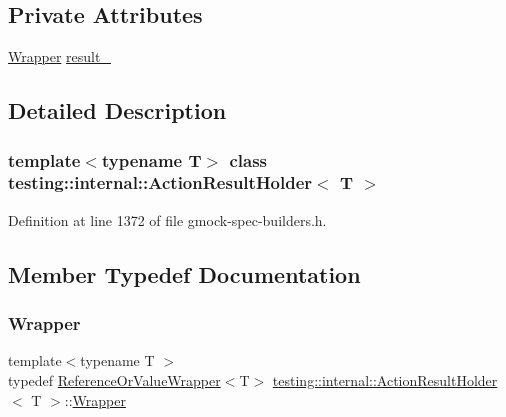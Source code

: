 \subsection*{Private Attributes}
\begin{DoxyCompactItemize}
\item 
\hyperlink{classtesting_1_1internal_1_1ActionResultHolder_aa483b488570efd86657857501dce2b1d}{Wrapper} \hyperlink{classtesting_1_1internal_1_1ActionResultHolder_a76fc150d4247a041353cdd859976198b}{result\+\_\+}
\end{DoxyCompactItemize}


\subsection{Detailed Description}
\subsubsection*{template$<$typename T$>$\newline
class testing\+::internal\+::\+Action\+Result\+Holder$<$ T $>$}



Definition at line 1372 of file gmock-\/spec-\/builders.\+h.



\subsection{Member Typedef Documentation}
\mbox{\label{classtesting_1_1internal_1_1ActionResultHolder_aa483b488570efd86657857501dce2b1d}} 
\subsubsection{\texorpdfstring{Wrapper}{Wrapper}}
{\footnotesize\ttfamily template$<$typename T $>$ \\
typedef \hyperlink{classtesting_1_1internal_1_1ReferenceOrValueWrapper}{Reference\+Or\+Value\+Wrapper}$<$T$>$ \hyperlink{classtesting_1_1internal_1_1ActionResultHolder}{testing\+::internal\+::\+Action\+Result\+Holder}$<$ T $>$\+::\hyperlink{classtesting_1_1internal_1_1ActionResultHolder_aa483b488570efd86657857501dce2b1d}{Wrapper}\hspace{0.3cm}{\ttfamily [private]}}



